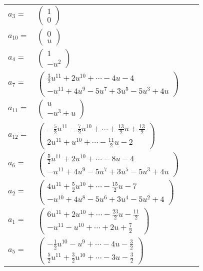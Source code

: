 \documentclass[1p]{elsarticle_modified}
\theoremstyle{definition}
\begin{document}
\begin{tabular}{m{7pt} m{180pt} m{7pt} m{180pt} }
\flushright $a_{3}=$&$\begin{pmatrix}1\\0\end{pmatrix}$ \\
\flushright $a_{10}=$&$\begin{pmatrix}0\\u\end{pmatrix}$ \\
\flushright $a_{4}=$&$\begin{pmatrix}1\\- u^2\end{pmatrix}$ \\
\flushright $a_{7}=$&$\begin{pmatrix}\frac{3}{2} u^{11}+2 u^{10}+\cdots-4 u-4\\- u^{11}+4 u^9-5 u^7+3 u^5-5 u^3+4 u\end{pmatrix}$ \\
\flushright $a_{11}=$&$\begin{pmatrix}u\\- u^3+u\end{pmatrix}$ \\
\flushright $a_{12}=$&$\begin{pmatrix}-\frac{5}{2} u^{11}-\frac{7}{2} u^{10}+\cdots+\frac{13}{2} u+\frac{13}{2}\\2 u^{11}+u^{10}+\cdots-\frac{11}{2} u-2\end{pmatrix}$ \\
\flushright $a_{6}=$&$\begin{pmatrix}\frac{5}{2} u^{11}+2 u^{10}+\cdots-8 u-4\\- u^{11}+4 u^9-5 u^7+3 u^5-5 u^3+4 u\end{pmatrix}$ \\
\flushright $a_{2}=$&$\begin{pmatrix}4 u^{11}+\frac{5}{2} u^{10}+\cdots-\frac{15}{2} u-7\\- u^{10}+4 u^8-5 u^6+3 u^4-5 u^2+4\end{pmatrix}$ \\
\flushright $a_{1}=$&$\begin{pmatrix}6 u^{11}+2 u^{10}+\cdots-\frac{23}{2} u-\frac{11}{2}\\- u^{11}- u^{10}+\cdots+2 u+\frac{7}{2}\end{pmatrix}$ \\
\flushright $a_{5}=$&$\begin{pmatrix}-\frac{1}{2} u^{10}- u^9+\cdots-4 u-\frac{3}{2}\\\frac{5}{2} u^{11}+\frac{3}{2} u^{10}+\cdots-3 u-\frac{3}{2}\end{pmatrix}$ \\

\end{tabular}
\end{document}
